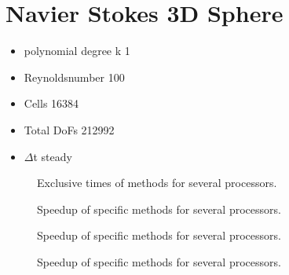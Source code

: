 \documentclass{article}
\begin{document}
\section*{Navier Stokes 3D Sphere}
\begin{itemize}
	\large \item  polynomial degree k 1
	\item Reynoldsnumber 100
	\item Cells 16384
	\item Total DoFs 212992
	\item $\Delta$t steady
\end{itemize}
	\begin{figure}
		\hspace{-2cm}
		\rule{0cm}{1.1cm}
		\caption{Exclusive times of methods for several processors.}
	\end{figure}
	\begin{figure}
		\hspace{-2cm}
		\rule{0cm}{1.1cm}
		\caption{Speedup of specific methods for several processors.}
	\end{figure}
		\begin{figure}
		\hspace{-2cm}
		\rule{0cm}{1.1cm}
		\caption{Speedup of specific methods for several processors.}
		\end{figure}
		\begin{figure}
			\hspace{-2cm}
			\rule{0cm}{1.1cm}
			\caption{Speedup of specific methods for several processors.}
		\end{figure}
\end{document}
